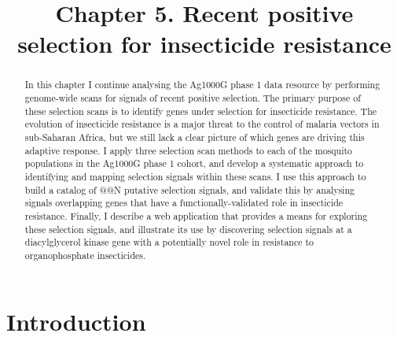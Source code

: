 \documentclass[a4paper,11pt,abstracton,hidelinks]{scrartcl}
\title{
Chapter 5. Recent positive selection for insecticide resistance
}
\author{}
\begin{document}
\renewcommand{\abstractname}{Summary}


\maketitle


\begin{abstract}


In this chapter I continue analysing the Ag1000G phase 1 data resource by performing genome-wide scans for signals of recent positive selection.
%
The primary purpose of these selection scans is to identify genes under selection for insecticide resistance.
%
The evolution of insecticide resistance is a major threat to the control of malaria vectors in sub-Saharan Africa, but we still lack a clear picture of which genes are driving this adaptive response.
%
I apply three selection scan methods to each of the mosquito populations in the Ag1000G phase 1 cohort, and develop a systematic approach to identifying and mapping selection signals within these scans.
%
I use this approach to build a catalog of @@N putative selection signals, and validate this by analysing signals overlapping genes that have a functionally-validated role in insecticide resistance.
%
Finally, I describe a web application that provides a means for exploring these selection signals, and illustrate its use by discovering selection signals at a diacylglycerol kinase gene with a potentially novel role in resistance to organophosphate insecticides.


\end{abstract}


\tableofcontents


\section{Introduction}\label{sec:introduction}


\end{document}
